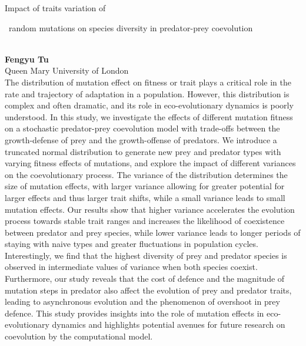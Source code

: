 \documentclass[12pt,a4paper]{article}
\newcommand{\ZAbst}{\rule[-1ex]{0pt}{2ex}\ } %
\begin{document}
\noindent
{\Large Impact of traits variation of\ZAbst random mutations on species diversity in predator-prey coevolution}\\[1ex]
{\large 
\textbf{Fengyu Tu}\\[1ex] Queen Mary University of London}\\[2ex]
The distribution of mutation effect on fitness or trait plays a critical role in the rate and trajectory of adaptation in a population. However, this distribution is complex and often dramatic, and its role in eco-evolutionary dynamics is poorly understood. In this study, we investigate the effects of different mutation fitness on a stochastic predator-prey coevolution model with trade-offs between the growth-defense of prey and the growth-offense of predators. We introduce a truncated normal distribution to generate new prey and predator types with varying fitness effects of mutations, and explore the impact of different variances on the coevolutionary process. The variance of the distribution determines the size of mutation effects, with larger variance allowing for greater potential for larger effects and thus larger trait shifts, while a small variance leads to small mutation effects. Our results show that higher variance accelerates the evolution process towards stable trait ranges and increases the likelihood of coexistence between predator and prey species, while lower variance leads to longer periods of staying with naive types and greater fluctuations in population cycles. Interestingly, we find that the highest diversity of prey and predator species is observed in intermediate values of variance when both species coexist. Furthermore, our study reveals that the cost of defence and the magnitude of mutation steps in predator also affect the evolution of prey and predator traits, leading to asynchronous evolution and the phenomenon of overshoot in prey defence. This study provides insights into the role of mutation effects in eco-evolutionary dynamics and highlights potential avenues for future research on coevolution by the computational model. 
\end{document}
